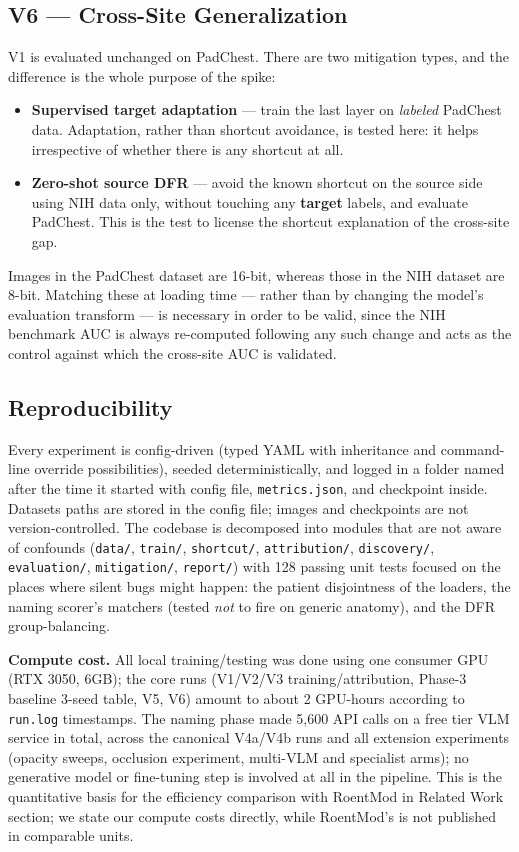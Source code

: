 \documentclass{ieeeaccess}
\begin{document}
\subsection{V6 --- Cross-Site Generalization}
V1 is evaluated unchanged on PadChest. There are two mitigation types, and the difference is the whole purpose of the spike:
\begin{itemize}
\item \textbf{Supervised target adaptation} --- train the last layer on \emph{labeled} PadChest data. Adaptation, rather than shortcut avoidance, is tested here: it helps irrespective of whether there is any shortcut at all.
\item \textbf{Zero-shot source DFR} --- avoid the known shortcut on the source side using NIH data only, without touching any \textbf{target} labels, and evaluate PadChest. This is the test to license the shortcut explanation of the cross-site gap.
\end{itemize}

Images in the PadChest dataset are 16-bit, whereas those in the NIH dataset are 8-bit. Matching these at loading time --- rather than by changing the model's evaluation transform --- is necessary in order to be valid, since the NIH benchmark AUC is always re-computed following any such change and acts as the control against which the cross-site AUC is validated.

\subsection{Reproducibility}
Every experiment is config-driven (typed YAML with inheritance and command-line override possibilities), seeded deterministically, and logged in a folder named after the time it started with config file, \texttt{metrics.json}, and checkpoint inside. Datasets paths are stored in the config file; images and checkpoints are not version-controlled. The codebase is decomposed into modules that are not aware of confounds (\texttt{data/}, \texttt{train/}, \texttt{shortcut/}, \texttt{attribution/}, \texttt{discovery/}, \texttt{evaluation/}, \texttt{mitigation/}, \texttt{report/}) with 128 passing unit tests focused on the places where silent bugs might happen: the patient disjointness of the loaders, the naming scorer's matchers (tested \emph{not} to fire on generic anatomy), and the DFR group-balancing.

\textbf{Compute cost.} All local training/testing was done using one consumer GPU (RTX 3050, 6GB); the core runs (V1/V2/V3 training/attribution, Phase-3 baseline 3-seed table, V5, V6) amount to about 2 GPU-hours according to \texttt{run.log} timestamps. The naming phase made 5,600 API calls on a free tier VLM service in total, across the canonical V4a/V4b runs and all extension experiments (opacity sweeps, occlusion experiment, multi-VLM and specialist arms); no generative model or fine-tuning step is involved at all in the pipeline. This is the quantitative basis for the efficiency comparison with RoentMod in Related Work section; we state our compute costs directly, while RoentMod's is not published in comparable units.
\end{document}
